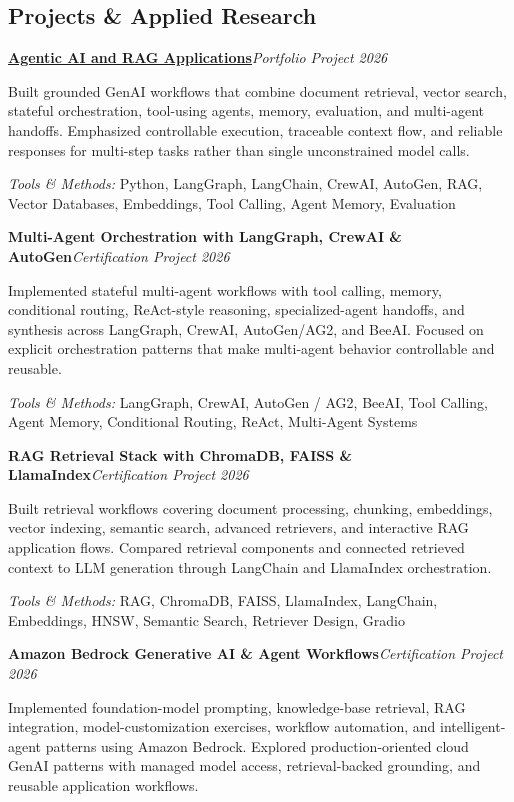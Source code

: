 \documentclass[9pt,letterpaper]{extarticle}
\newcommand{\entry}[2]{\Needspace{4\baselineskip}\textbf{#1}\hfill\textit{#2}\par}
\begin{document}
\subsection{Projects \& Applied Research}
\entry{\href{https://github.com/WaseemRaza844/agentic-ai-projects-by-was}{Agentic AI and RAG Applications}}{Portfolio Project \textbar{} 2026}
Built grounded GenAI workflows that combine document retrieval, vector search, stateful orchestration, tool-using agents, memory, evaluation, and multi-agent handoffs. Emphasized controllable execution, traceable context flow, and reliable responses for multi-step tasks rather than single unconstrained model calls.\par
{\small\textit{Tools \& Methods:} Python, LangGraph, LangChain, CrewAI, AutoGen, RAG, Vector Databases, Embeddings, Tool Calling, Agent Memory, Evaluation\par}
\vspace{1pt}
\entry{Multi-Agent Orchestration with LangGraph, CrewAI \& AutoGen}{Certification Project \textbar{} 2026}
Implemented stateful multi-agent workflows with tool calling, memory, conditional routing, ReAct-style reasoning, specialized-agent handoffs, and synthesis across LangGraph, CrewAI, AutoGen/AG2, and BeeAI. Focused on explicit orchestration patterns that make multi-agent behavior controllable and reusable.\par
{\small\textit{Tools \& Methods:} LangGraph, CrewAI, AutoGen / AG2, BeeAI, Tool Calling, Agent Memory, Conditional Routing, ReAct, Multi-Agent Systems\par}
\vspace{1pt}
\entry{RAG Retrieval Stack with ChromaDB, FAISS \& LlamaIndex}{Certification Project \textbar{} 2026}
Built retrieval workflows covering document processing, chunking, embeddings, vector indexing, semantic search, advanced retrievers, and interactive RAG application flows. Compared retrieval components and connected retrieved context to LLM generation through LangChain and LlamaIndex orchestration.\par
{\small\textit{Tools \& Methods:} RAG, ChromaDB, FAISS, LlamaIndex, LangChain, Embeddings, HNSW, Semantic Search, Retriever Design, Gradio\par}
\vspace{1pt}
\entry{Amazon Bedrock Generative AI \& Agent Workflows}{Certification Project \textbar{} 2026}
Implemented foundation-model prompting, knowledge-base retrieval, RAG integration, model-customization exercises, workflow automation, and intelligent-agent patterns using Amazon Bedrock. Explored production-oriented cloud GenAI patterns with managed model access, retrieval-backed grounding, and reusable application workflows.\par
\end{document}
